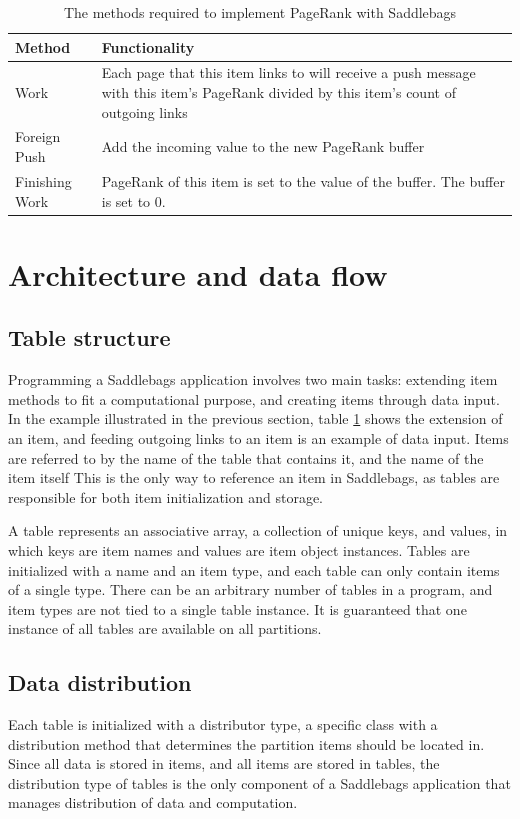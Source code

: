 \documentclass{uit-report}
\begin{document}
\begin{table}[h]
	\setlength\arrayrulewidth{1pt}
	\renewcommand{\arraystretch}{2}
	\begin{tabular}{ | p{3cm} | p{12cm} |}
		\hline
		\textbf{Method} & \textbf{Functionality} \\ \hline
		Work & Each page that this item links to will receive a push message with this item's PageRank divided by this item's count of outgoing links \\ \hline
		Foreign Push & Add the incoming value to the new PageRank buffer \\ \hline
		Finishing Work & PageRank of this item is set to the value of the buffer. The buffer is set to 0.\\ \hline
		
	\end{tabular}
	\caption{The methods required to implement PageRank with Saddlebags}
	\label{table:pagerankevents}
\end{table}

\section{Architecture and data flow}
\subsection{Table structure}
Programming a Saddlebags application involves two main tasks: extending item methods to fit a computational purpose, and creating items through data input. In the example illustrated in the previous section, table \ref{table:pagerankevents} shows the extension of an item, and feeding outgoing links to an item is an example of data input. Items are referred to by the name of the table that contains it, and the name of the item itself This is the only way to reference an item in Saddlebags, as tables are responsible for both item initialization and storage.

A table represents an associative array, a collection of unique keys, and values, in which keys are item names and values are item object instances.  Tables are initialized with a name and an item type, and each table can only contain items of a single type. There can be an arbitrary number of tables in a program, and item types are not tied to a single table instance. It is guaranteed that one instance of all tables are available on all partitions.




\subsection{Data distribution}
Each table is initialized with a distributor type, a specific class with a distribution method that determines the partition items should be located in. Since all data is stored in items, and all items are stored in tables, the distribution type of tables is the only component of a Saddlebags application that manages distribution of data and computation.
\end{document}
